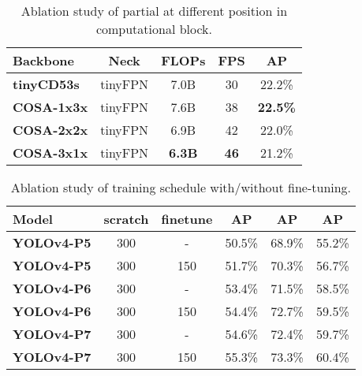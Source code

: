 \documentclass[10pt,twocolumn,letterpaper]{article}
\begin{document}
\begin{table}[t]
	\centering
	\begin{threeparttable}[h]
		\footnotesize
		\caption{Ablation study of partial at different position in computational block.}
		\label{table:t10}
		\setlength\tabcolsep{3.5pt}
		\begin{tabular}{lcccc}
			\toprule
			\textbf{Backbone} & \textbf{Neck} & \textbf{FLOPs} & \textbf{FPS} & \textbf{AP} \\				
			\midrule
			\textbf{tinyCD53s} & tinyFPN & 7.0B & 30 & 22.2\% \\
			\textbf{COSA-1x3x} & tinyFPN & 7.6B & 38 & \textbf{22.5\%} \\
			\textbf{COSA-2x2x} & tinyFPN & 6.9B & 42 & 22.0\% \\
			\textbf{COSA-3x1x} & tinyFPN & \textbf{6.3B} & \textbf{46} & 21.2\% \\
			\bottomrule
		\end{tabular}
	\end{threeparttable}
\end{table}

\begin{table}[t]
	\centering
	\begin{threeparttable}[h]
		\footnotesize
		\caption{Ablation study of training schedule with/without fine-tuning.}
		\label{table:t11}
		\setlength\tabcolsep{3.5pt}
		\begin{tabular}{lccccc}
			\toprule
			\textbf{Model} & \textbf{scratch} & \textbf{finetune} & \textbf{AP} & \textbf{AP} & \textbf{AP} \\				
			\midrule
			\textbf{YOLOv4-P5} & 300 & - & 50.5\% & 68.9\% & 55.2\% \\
			\textbf{YOLOv4-P5} & 300 & 150 & 51.7\% & 70.3\% & 56.7\% \\
			\textbf{YOLOv4-P6} & 300 & - & 53.4\% & 71.5\% & 58.5\% \\
			\textbf{YOLOv4-P6} & 300 & 150 & 54.4\% & 72.7\% & 59.5\% \\
			\textbf{YOLOv4-P7} & 300 & - & 54.6\% & 72.4\% & 59.7\% \\
			\textbf{YOLOv4-P7} & 300 & 150 & 55.3\% & 73.3\% & 60.4\% \\
			\bottomrule
		\end{tabular}
	\end{threeparttable}
\end{table}
\end{document}
